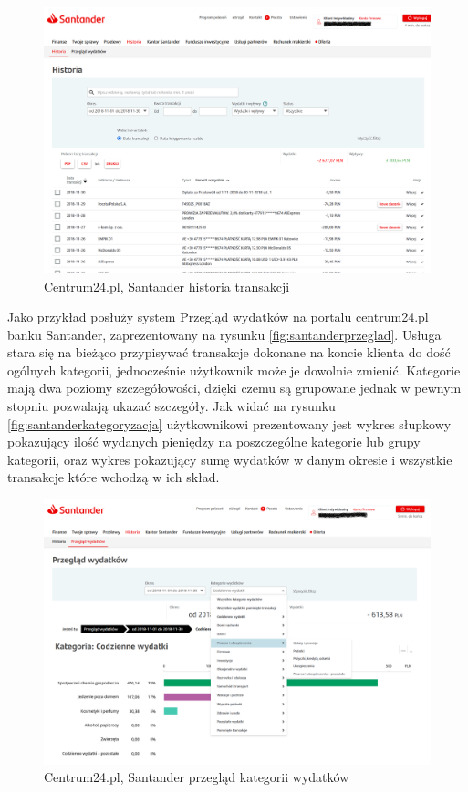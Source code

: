 \documentclass[a4paper,10pt, twoside]{report}
\begin{document}
\begin{large}
\begin{figure}[H]           %
    \centering
    \includegraphics[width=12cm]{figures/Santander_PrzegladWydatkow_historia.png}
    \caption{Centrum24.pl, Santander historia transakcji}
    \label{fig:santanderhistoria}
\end{figure}

{Jako przykład posłuży system Przegląd wydatków na portalu centrum24.pl banku 
Santander, zaprezentowany na rysunku \ref{fig:santanderprzeglad}. Usługa stara 
się na bieżąco przypisywać transakcje dokonane na koncie klienta do dość 
ogólnych kategorii, jednocześnie użytkownik może je dowolnie zmienić. Kategorie 
mają dwa poziomy szczegółowości, dzięki czemu są grupowane jednak w pewnym 
stopniu pozwalają ukazać szczegóły. Jak widać na rysunku 
\ref{fig:santanderkategoryzacja} użytkownikowi prezentowany jest wykres słupkowy
 pokazujący ilość wydanych pieniędzy na poszczególne kategorie lub grupy 
kategorii, oraz wykres pokazujący sumę wydatków w danym okresie i wszystkie 
transakcje które wchodzą w ich skład.}

\begin{figure}[H]           %
    \centering
    \includegraphics[width=12cm]{figures/Santander_PrzegladWydatkow_przeglad_kategoria.png}
    \caption{Centrum24.pl, Santander przegląd kategorii wydatków}
    \label{fig:santanderprzegladkategoria}


\end{figure}
\end{large}
\end{document}
